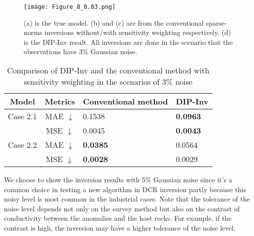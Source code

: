 \documentclass{article}
\begin{document}
\begin{figure}[h!]
\centering
\texttt{[image: Figure\_8\_0.03.png]}
\caption{(a) is the true model. (b) and (c) are from the conventional sparse-norms inversions without/with sensitivity weighting respectively. (d) is the DIP-Inv result. All inversions are done in the scenario that the observations have 3$\%$ Gaussian noise.}
\label{fig_6}
\end{figure}

\begin{table}[h!]
\centering
\caption{Comparison of DIP-Inv and the conventional method with sensitivity weighting in the scenarios of 3$\%$ noise}
\begin{tabular}{|c|c|l|l|}
\hline
Model & Metrics & Conventional method& DIP-Inv\\
\hline
Case 2.1 & MAE $\downarrow$ & 0.1538 & \textbf{0.0963}\\
 & MSE $\downarrow$ & 0.0045 & \textbf{0.0043}\\
\hline
Case 2.2 & MAE $\downarrow$ & \textbf{0.0385} & 0.0564\\
 & MSE $\downarrow$ & \textbf{0.0028} & 0.0029\\
\hline
\end{tabular}
\label{table:4}
\end{table}

\pagebreak

We choose to show the inversion results with 5$\%$ Gaussian noise since it's a common choice in testing a new algorithm in DCR inversion \cite{1} partly because this noisy level is most common in the industrial cases. Note that the tolerance of the noise level depends not only on the survey method but also on the contrast of conductivity between the anomalies and the host rocks. For example, if the contrast is high, the inversion may have a higher tolerance of the noise level. 





\end{document}

